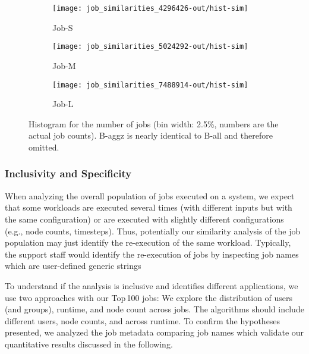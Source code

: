 \documentclass{jhps}
\begin{document}
\begin{figure}
\centering

\begin{subfigure}{0.67\textwidth}
\centering
\texttt{[image: job\_similarities\_4296426-out/hist-sim]}
\caption{Job-S}\label{fig:hist-job-S}
\end{subfigure}

\begin{subfigure}{0.67\textwidth}
\centering
\texttt{[image: job\_similarities\_5024292-out/hist-sim]}
\caption{Job-M}\label{fig:hist-job-M}
\end{subfigure}

\begin{subfigure}{0.67\textwidth}
\centering
\texttt{[image: job\_similarities\_7488914-out/hist-sim]}
\caption{Job-L}\label{fig:hist-job-L}
\end{subfigure}
\centering
\caption{Histogram for the number of jobs (bin width: 2.5\%, numbers are the actual job counts). B-aggz is nearly identical to B-all and therefore omitted.}%
\label{fig:hist}
\end{figure}

\subsubsection{Inclusivity and Specificity}

When analyzing the overall population of jobs executed on a system, we expect that some workloads are executed several times (with different inputs but with the same configuration) or are executed with slightly different configurations (e.g., node counts, timesteps).
Thus, potentially our similarity analysis of the job population may just identify the re-execution of the same workload.
Typically, the support staff would identify the re-execution of jobs by inspecting job names which are user-defined generic strings%

To understand if the analysis is inclusive and identifies different applications, we use two approaches with our Top\,100 jobs:
We explore the distribution of users (and groups), runtime, and node count across jobs.
The algorithms should include different users, node counts, and across runtime.
To confirm the hypotheses presented, we analyzed the job metadata comparing job names which validate our quantitative results discussed in the following.
\end{document}
